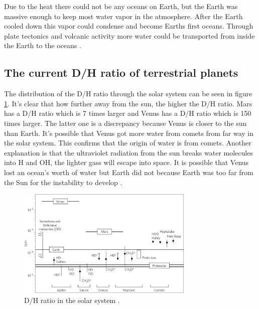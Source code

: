 Due to the heat there could not be any oceans on Earth, but the Earth was massive enough to keep most water vapor in the atmosphere. After the Earth cooled down this vapor could condense and become Earths first oceans. Through plate tectonics and volcanic activity more water could be transported from inside the Earth to the oceans \cite[p.~130-131]{TPmagma}.


\newpage
\subsection{The current D/H ratio of terrestrial planets}
The distribution of the D/H ratio through the solar system can be seen in figure \ref{fig:dh-ratio-terrestrial-planets}. It's clear that how further away from the sun, the higher the D/H ratio. Mars has a D/H ratio which is 7 times larger and Venus has a D/H ratio which is 150 times larger. The latter one is a discrepancy because Venus is closer to the sun than Earth. It's possible that Venus got more water from comets from far way in the solar system. This confirms that the origin of water is from comets. Another explanation is that the ultraviolet radiation from the sun breaks water molecules into H and OH, the lighter gass will escape into space. It is possible that Venus lost an ocean’s worth of water but Earth did not because Earth was too far from the Sun for the instability to develop \cite{TPthreeEras}.

\begin{figure}[H]
	\center
	\includegraphics[width=0.75\textwidth]{figures/dh-ratio-terrestrial-planets.jpg}
	\caption{\label{fig:dh-ratio-terrestrial-planets}D/H ratio in the solar system \cite{TPthreeEras}.}
\end{figure}

